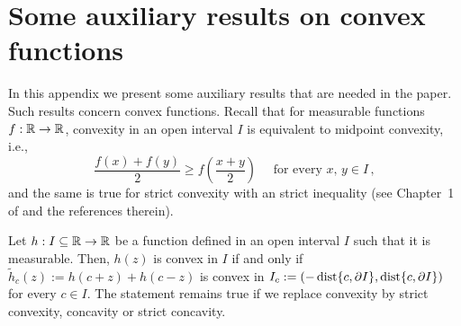\section{Some auxiliary results on convex functions}
\label{Sec:AuxiliaryResults}

In this appendix we present some auxiliary results that are needed in the paper. Such results
concern convex functions. Recall that for measurable functions $f:\mathbb{R}\to \mathbb{R}$, convexity in an open
interval $I$ is equivalent to midpoint convexity, i.e.,
$$
\dfrac{f(x) + f(y)}{2} \geq f \left( \dfrac{x+y}{2}\right) \quad \textrm{ for every } x,\, y \in I\,,
$$
and the same is true for strict convexity with an strict inequality
(see Chapter~1 of \cite{Niculescu} and the references therein).


\begin{lemma}
\label{Lemma:Convex<->AllReflectionsConvex} Let $h: I \subseteq \mathbb{R} \to \mathbb{R}$ be a function defined in
an open interval $I$ such that it is measurable. Then, $h(z)$ is convex in $I$ if and only if
$\widetilde{h}_c(z) := h(c+z) + h(c-z)$ is convex in $I_c := (-\operatorname{dist}\{c, \partial I\}, \operatorname{dist}\{c,
\partial I\})$ for every $c\in I$. The statement remains true if we replace convexity by strict
convexity, concavity or strict concavity.
\end{lemma}

